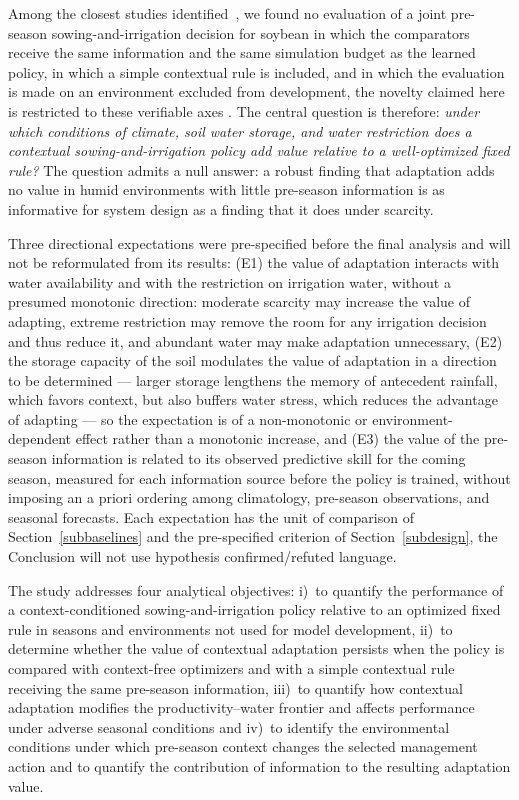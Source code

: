 \documentclass[times,final,authoryear]{elsarticle}
\begin{document}
Among the closest studies identified~\citep{kelly2024assessing, balderas2025comparative, noa2026hybrid}, we found no evaluation of a joint pre-season sowing-and-irrigation decision for soybean in which the comparators receive the same information and the same simulation budget as the learned policy, in which a simple contextual rule is included, and in which the evaluation is made on an environment excluded from development, the novelty claimed here is restricted to these verifiable axes . The central question is therefore: \emph{under which conditions of climate, soil water storage, and water restriction does a contextual sowing-and-irrigation policy add value relative to a well-optimized fixed rule?} The question admits a null answer: a robust finding that adaptation adds no value in humid environments with little pre-season information is as informative for system design as a finding that it does under scarcity.

Three directional expectations were pre-specified before the final analysis and will not be reformulated from its results: (E1) the value of adaptation interacts with water availability and with the restriction on irrigation water, without a presumed monotonic direction: moderate scarcity may increase the value of adapting, extreme restriction may remove the room for any irrigation decision and thus reduce it, and abundant water may make adaptation unnecessary, (E2) the storage capacity of the soil modulates the value of adaptation in a direction to be determined --- larger storage lengthens the memory of antecedent rainfall, which favors context, but also buffers water stress, which reduces the advantage of adapting --- so the expectation is of a non-monotonic or environment-dependent effect rather than a monotonic increase, and (E3) the value of the pre-season information is related to its observed predictive skill for the coming season, measured for each information source before the policy is trained, without imposing an a priori ordering among climatology, pre-season observations, and seasonal forecasts. Each expectation has the unit of comparison of Section~\ref{subbaselines} and the pre-specified criterion of Section~\ref{subdesign}, the Conclusion will not use hypothesis confirmed/refuted language.

The study addresses four analytical objectives: i)~to quantify the performance of a context-conditioned sowing-and-irrigation policy relative to an optimized fixed rule in seasons and environments not used for model development, ii)~to determine whether the value of contextual adaptation persists when the policy is compared with context-free optimizers and with a simple contextual rule receiving the same pre-season information, iii)~to quantify how contextual adaptation modifies the productivity--water frontier and affects performance under adverse seasonal conditions and iv)~to identify the environmental conditions under which pre-season context changes the selected management action and to quantify the contribution of information to the resulting adaptation value.
\end{document}
